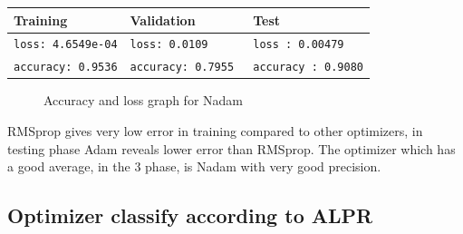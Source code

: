 \documentclass[lnbip]{svmultln}
\newcommand{\myfloatalign}{\centering}
\begin{document}
	\begin{table}[H]
		\centering
		\begin{tabular}{l|l|l}
			\hline
			\textbf{Training} & \textbf{Validation} & \textbf{Test} \\
			\hline
			\texttt{loss: 4.6549e-04} & \texttt{loss: 0.0109} & \texttt{loss : 0.00479} \\
			\texttt{accuracy: 0.9536} & \texttt{accuracy: 0.7955 }& \texttt{accuracy : 0.9080}\\
			
			\hline 
			
		\end{tabular}
	\end{table}
	
	\begin{figure}[H]
		\myfloatalign
		 \quad
		
		\caption[]{Accuracy and loss graph for Nadam}
	\end{figure}
	RMSprop gives very low error in training compared to other optimizers, in testing phase Adam reveals lower error than RMSprop. The optimizer which has a good average, in the 3 phase, is Nadam with very good precision.
	
	
	\subsection{Optimizer classify  according to ALPR} %
	
\end{document}
